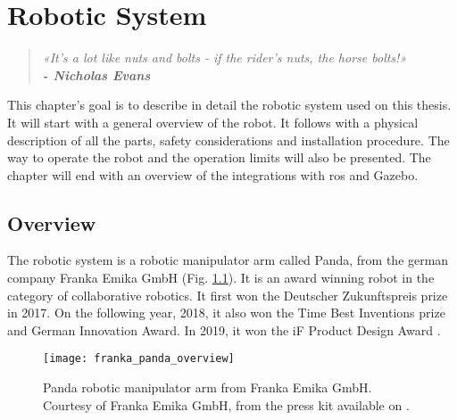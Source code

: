 \chapter{Robotic System}
\label{cha:robotic_system}

\begin{quotation}
\begin{flushright}
\itshape
«It's a lot like nuts and bolts - if the rider's nuts, the horse bolts!»\\
\textbf{- Nicholas Evans}
\end{flushright}
\end{quotation}

This chapter's goal is to describe in detail the robotic system used on this thesis. It will start with a general overview of the robot. It follows with a physical description of all the parts, safety considerations and installation procedure. The way to operate the robot and the operation limits will also be presented. The chapter will end with an overview of the integrations with \gls{ros} and Gazebo.


\section{Overview}
\label{sec:robotic_system_overview}

The robotic system is a robotic manipulator arm called Panda, from the german company Franka Emika GmbH (Fig. \ref{fig:franka_panda_overview}). It is an award winning robot in the category of collaborative robotics. It first won the Deutscher Zukunftspreis prize in 2017. On the following year, 2018, it also won the Time Best Inventions prize and German Innovation Award. In 2019, it won the iF Product Design Award \cite{FrankaEmikaGmbH_official_website}. 

\begin{figure}[htbp]
	\centering
	\texttt{[image: franka\_panda\_overview]}
	\caption{Panda robotic manipulator arm from Franka Emika GmbH. Courtesy of Franka Emika GmbH, from the press kit available on \cite{FrankaEmikaGmbH_official_website}.}
	\label{fig:franka_panda_overview}
\end{figure}

